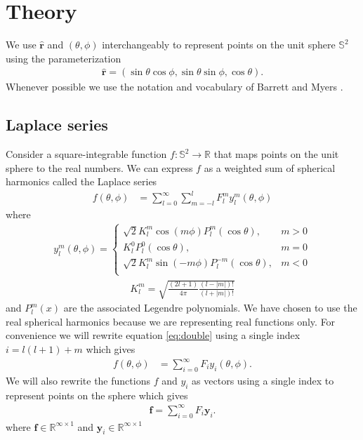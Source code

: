 \documentclass[10pt]{article}
\providecommand{\mb}[1]{\mathbf{#1}}
\providecommand{\mh}[1]{\mathbf{\hat{#1}}}
\providecommand{\mbb}[1]{\mathbb{#1}}
\begin{document}
\section{Theory}
We use $\mh{r}$ and $(\theta, \phi)$ interchangeably to represent points on the
unit sphere $\mbb{S}^2$ using the parameterization
\begin{align}
\mh{r} = (\sin\theta\cos\phi, \sin\theta\sin\phi, \cos\theta).
\end{align}
Whenever possible we use the notation and vocabulary of Barrett and Myers
\cite{barrett}.

\subsection{Laplace series}
Consider a square-integrable function $f: \mbb{S}^2 \rightarrow \mbb{R}$ that
maps points on the unit sphere to the real numbers. We can express $f$ as a
weighted sum of spherical harmonics called the Laplace series \cite{arfken,
  sloan}
\begin{align}
  f(\theta, \phi) &= \sum_{l=0}^{\infty}\sum_{m=-l}^{l}F_l^m y_l^m(\theta, \phi) \label{eq:double}
\end{align}
where 
\begin{align}
  y_l^m(\theta, \phi) =
  \begin{cases}
    \sqrt{2}K_l^m\cos(m\phi)P_l^m(\cos\theta), & m > 0\\
    K_l^0P_l^0(\cos\theta), & m = 0\\
    \sqrt{2}K_l^m\sin(-m\phi)P_l^{-m}(\cos\theta), & m < 0\\
  \end{cases}
\end{align}
\begin{align}
  K_l^m = \sqrt{\frac{(2l+1)}{4\pi}\frac{(l-|m|)!}{(l+|m|)!}}
\end{align}
and $P_l^m(x)$ are the associated Legendre polynomials. We have chosen to use
the real spherical harmonics because we are representing real functions
only. For convenience we will rewrite equation \ref{eq:double} using a single
index $i = l(l+1) + m$ which gives
\begin{align}
  f(\theta, \phi) &= \sum_{i=0}^{\infty}F_iy_i(\theta, \phi). \label{eq:concrete}
\end{align}
We will also rewrite the functions $f$ and $y_i$ as vectors using a single index
to represent points on the sphere which gives
\begin{align}
  \mb{f} = \sum_{i=0}^{\infty}F_i\mb{y}_i. \label{eq:concrete2}
\end{align}
where $\mb{f} \in \mbb{R}^{\infty\times 1}$ and $\mb{y}_i \in \mbb{R}^{\infty\times 1}$
\end{document}
